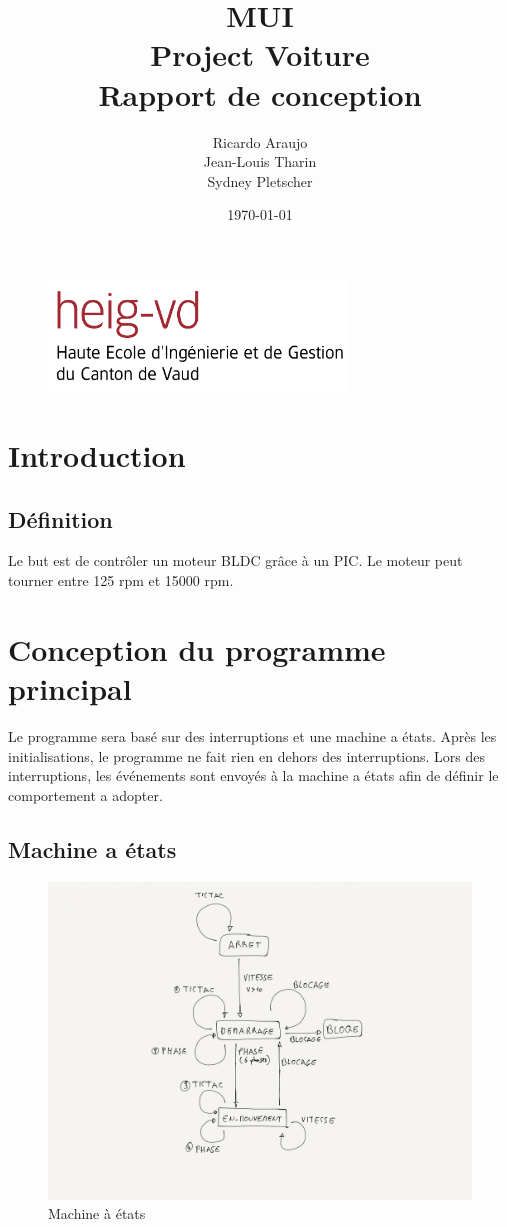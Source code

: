 \documentclass[fleqn, 11pt, a4paper]{article}
\author{Ricardo Araujo\\
  Jean-Louis Tharin\\
  Sydney Pletscher}
\title{MUI\\
Project Voiture\\
 Rapport de conception}
\date{\today}
\begin{document}
\maketitle
\vspace{8cm}
\begin{figure}[H]
\includegraphics[width=8cm]{heig-vd_logo_couleur_format_jpg}
\centering
\end{figure}

\newpage

\tableofcontents

\newpage

\section{Introduction}
	\subsection{Définition}
	Le but est de contrôler un moteur BLDC grâce à un PIC.
	Le moteur peut tourner entre 125 rpm et 15000 rpm.

\section{Conception du programme principal}
Le programme sera basé sur des interruptions et une machine a états.
Après les initialisations, le programme ne fait rien en dehors des interruptions.
Lors des interruptions, les événements sont envoyés à la machine a états afin de définir le comportement a adopter.

  \subsection{Machine a états}
  \begin{figure}[H]
    \centering
    \includegraphics[width=16cm]{state_machine}
    \caption{Machine à états}
    \label{fig:state_machine}
  \end{figure}
\end{document}
